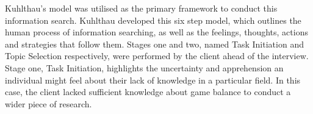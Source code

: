 Kuhlthau's model was utilised as the primary framework to conduct this information search. Kuhlthau developed this six step model, which outlines the human process of information searching, as well as the feelings, thoughts, actions and strategies that follow them. Stages one and two, named Task Initiation and Topic Selection respectively, were performed by the client ahead of the interview.
Stage one, Task Initiation, highlights the uncertainty and apprehension an individual might feel about their lack of knowledge in a particular field. In this case, the client lacked sufficient knowledge about game balance to conduct a wider piece of research. 

